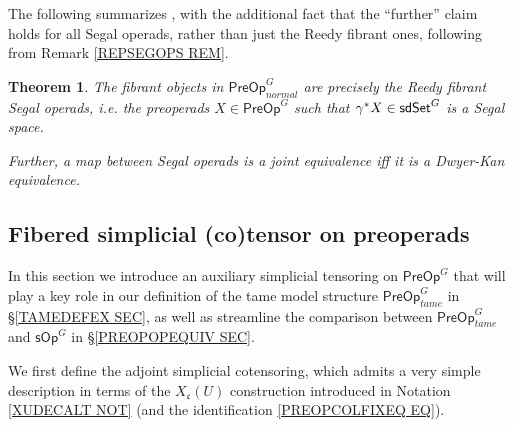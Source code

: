 \documentclass[a4paper,10pt
,draft
]{article}%
\numberwithin{equation}{section}
\numberwithin{figure}{section}
\newtheorem{theorem}[equation]{Theorem}%
\theoremstyle{definition} %
\newcommand{\1}{\ensuremath{\mathbbm 1}}%
\begin{document}
The following summarizes 
\cite[Thms. 5.51 and 5.48]{BP_edss},
with the additional fact that the ``further'' claim
holds for all Segal operads, rather than just the Reedy fibrant ones, 
following from Remark \ref{REPSEGOPS REM}.



\begin{theorem}\label{FIBPREOP THM}
	The fibrant objects in $\mathsf{PreOp}^G_{normal}$
	are precisely the Reedy fibrant Segal operads,
	i.e. the preoperads $X \in \mathsf{PreOp}^G$ such that
	$\gamma^{\**} X \in \mathsf{sdSet}^G$ is a Segal space.
	
	Further, a map between Segal operads is a joint equivalence iff it is a Dwyer-Kan equivalence.
\end{theorem}





\subsection{Fibered simplicial (co)tensor on preoperads}
\label{FIBTENS_SEC}



In this section we introduce an auxiliary 
simplicial tensoring on
$\mathsf{PreOp}^G$
that will play a key role in our definition of the tame model structure 
$\mathsf{PreOp}^G_{tame}$ in \S \ref{TAMEDEFEX SEC},
as well as streamline the comparison 
between
$\mathsf{PreOp}^G_{tame}$
and 
$\mathsf{sOp}^G$ in \S \ref{PREOPOPEQUIV SEC}.

We first define the adjoint simplicial cotensoring,
which admits a very simple description in terms
of the $X_{\mathfrak{c}}(U)$ construction introduced in
Notation \ref{XUDECALT NOT}
(and the identification 
\eqref{PREOPCOLFIXEQ EQ}).
\end{document}
